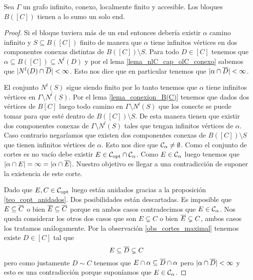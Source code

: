 \documentclass[tesis.tex]{subfiles}
\begin{document}
\begin{lema}\label{lema_bloques_1_end}
	Sea $\Gamma$ un grafo infinito, conexo, localmente finito y accesible.
	Los bloques $B([C])$ tienen a lo sumo un solo end.
\end{lema}
\begin{proof}
	Si el bloque tuviera más de un end entonces debería existir $\alpha$ camino infinito y $S \subseteq B([C])$ finito de manera que $\alpha$ tiene infinitos vértices en dos componentes conexas distintas de $B([C]) \setminus S$.
	Para todo $D \in [C]$ tenemos que $\alpha \subseteq B([C]) \subseteq N^l(D)$ y por el lema \ref{lema_nlC_cap_olC_conexo} sabemos que $|N^l(D) \cap \overline D | < \infty$.
	Esto nos dice que en particular tenemos que $|\alpha \cap \overline D| < \infty$.
	
	El conjunto $N^l(S)$ sigue siendo finito por lo tanto tenemos que $\alpha$ tiene infinitos vértices en $\Gamma \setminus N^l(S)$.
	Por el lema \ref{lema_conexion_B(C)} tenemos que dados dos vértices de $B[C]$ luego todo camino en $\Gamma \setminus N^l(S)$ que los conecte se puede tomar para que esté dentro de $B([C]) \setminus S$. 
	De esta manera tienen que existir dos componentes conexas de $\Gamma \setminus N^l(S)$ tales que tengan infinitos vértices de $\alpha$. 
	Caso contrario negaríamos que existen dos componentes conexas de $B([C]) \setminus S$ que tienen infinitos vértices de $\alpha$.
	Esto nos dice que ${\cal C}_{\alpha} \neq \emptyset$.
	Como el conjunto de cortes es no vacío debe existir $E \in {\cal C}_{\text{opt}} \cap {\cal C}_{\alpha}$.
	Como $E \in {\cal C}_{\alpha}$ luego tenemos que $|\alpha \cap E| = \infty = |\alpha \cap \overline E|$.
	Nuestro objetivo es llegar a una contradicción de suponer la existencia de este corte. 	
	
	Dado que $E,C \in {\cal C}_{\text{opt}}$ luego están anidados gracias a la proposición \ref{teo_copt_anidados}.
	Dos posibilidades están descartadas. 
	Es imposible que $E \subseteq \overline C$ o bien $\overline E \subseteq \overline C$ porque en ambos casos contradecimos que $E \in {\cal C}_{\alpha}$.
	Nos queda considerar los otros dos casos que son $E \subsetneq C$ o bien $\overline E \subsetneq C$, ambos casos los tratamos análogamente.
	Por la observación \ref{obs_cortes_maximal} tenemos existe $D \in [C]$ tal que 
	\[
		E \subseteq \overline D \subsetneq C
	\]
	pero como justamente $D \sim C$ tenemos que $E \cap \alpha \subseteq \overline D \cap \alpha$ pero $|\alpha \cap \overline D| < \infty$ y esto es una contradicción porque suponíamos que $E \in {\cal C}_{\alpha}$.
\end{proof}
\end{document}
